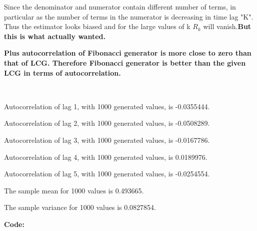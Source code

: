 \documentclass{article}
\begin{document}
Since the denominator and numerator contain different number of terms, in particular as the number of terms in the numerator is decreasing in time lag "K". Thus the estimator looks biased and for the large values of k \(R_k\) will vanish.\textbf{But this is what actually wanted.}




\textbf{Plus autocorrelation of Fibonacci generator is more close to zero than that of LCG. Therefore
Fibonacci generator is better than the given LCG in terms of autocorrelation.}

\
\
\
\

Autocorrelation of lag 1, with 1000 generated values, is -0.0355444.\

Autocorrelation of lag 2, with 1000 generated values, is -0.0508289.\

Autocorrelation of lag 3, with 1000 generated values, is -0.0167786.\

Autocorrelation of lag 4, with 1000 generated values, is 0.0189976.\

Autocorrelation of lag 5, with 1000 generated values, is -0.0254554.\

The sample mean for 1000 values is 0.493665.\

The sample variance for 1000 values is 0.0827854.





\textbf{Code: }\

\end{document}
